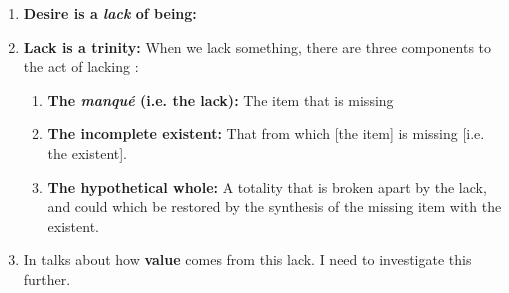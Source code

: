 \begin{enumerate}
\begin{enumerate}
\begin{enumerate}
      \item {}
    \end{enumerate}
  \end{enumerate}
  \item \textbf{Desire is a \emph{lack} of being:} 
  \item \textbf{Lack is a trinity:} When we lack something, there are three components to the act of lacking \autocite[138]{sartre}:
  \begin{enumerate}
    \item \textbf{The \emph{manqué} (i.e. the lack):} The item that is missing
    \item \textbf{The incomplete existent:} That from which [the item] is missing [i.e. the existent].
    \item \textbf{The hypothetical whole:} A totality that is broken apart by the lack, and could which be restored by the synthesis of the missing item with the existent.
  \end{enumerate}
  \item In \autocite[139]{sartre} talks about how \textbf{value} comes from this lack. I need to investigate this further.


\end{enumerate}
